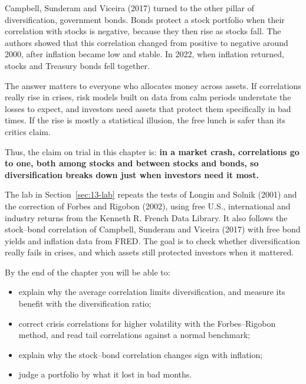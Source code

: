 Campbell, Sunderam and Viceira (2017) turned to the other pillar of diversification, government bonds. Bonds protect a stock portfolio when their correlation with stocks is negative, because they then rise as stocks fall. The authors showed that this correlation changed from positive to negative around 2000, after inflation became low and stable. In 2022, when inflation returned, stocks and Treasury bonds fell together.


The answer matters to everyone who allocates money across assets. If correlations really rise in crises, risk models built on data from calm periods understate the losses to expect, and investors need assets that protect them specifically in bad times. If the rise is mostly a statistical illusion, the free lunch is safer than its critics claim. 


Thus, the claim on trial in this chapter is: \textbf{in a market crash, correlations go to one, both among stocks and between stocks and bonds, so diversification breaks down just when investors need it most.}

The lab in Section~\ref{sec:13-lab} repeats the tests of Longin and Solnik (2001) and the correction of Forbes and Rigobon (2002), using free U.S., international and industry returns from the Kenneth R. French Data Library. It also follows the stock--bond correlation of Campbell, Sunderam and Viceira (2017) with free bond yields and inflation data from FRED. The goal is to check whether diversification really fails in crises, and which assets still protected investors when it mattered.

By the end of the chapter you will be able to:

\begin{itemize}
  \item explain why the average correlation limits diversification, and measure its benefit with the diversification ratio;
  \item correct crisis correlations for higher volatility with the Forbes--Rigobon method, and read tail correlations against a normal benchmark;
  \item explain why the stock--bond correlation changes sign with inflation;
  \item judge a portfolio by what it lost in bad months.
\end{itemize}



